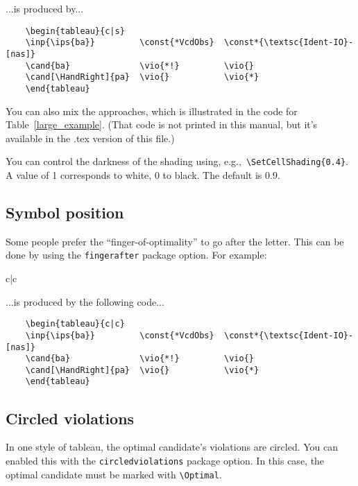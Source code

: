 \documentclass{article}
\def\eg{e.g.,~}
\begin{document}
\noindent ...is produced by...

\begin{verbatim}
	\begin{tableau}{c|s}
	\inp{\ips{ba}}         \const{*VcdObs}  \const*{\textsc{Ident-IO}-[nas]}
	\cand{ba}              \vio{*!}         \vio{}
	\cand[\HandRight]{pa}  \vio{}           \vio{*}
	\end{tableau}
\end{verbatim}

You can also mix the approaches, which is illustrated in the code for Table~\ref{large_example}. (That code is not printed in this manual, but it's available in the .tex version of this file.)

You can control the darkness of the shading using, \eg \verb+\SetCellShading{0.4}+. A value of 1 corresponds to white, 0 to black. The default is 0.9.

\subsection{Symbol position}
Some people prefer the ``finger-of-optimality'' to go after the letter. This can be done by using the \verb+fingerafter+ package option. For example:

\begin{center}
	\LetterBeforeFinger
	\begin{tableau}{c|c}
				
			\vio{*!}	\vio{}
		\vio{}		\vio{*}
	\end{tableau}
\end{center}

\noindent ...is produced by the following code...

\begin{verbatim}
	\begin{tableau}{c|c}
	\inp{\ips{ba}}         \const{*VcdObs}  \const*{\textsc{Ident-IO}-[nas]}
	\cand{ba}              \vio{*!}         \vio{}
	\cand[\HandRight]{pa}  \vio{}           \vio{*}
	\end{tableau}
\end{verbatim}

\subsection{Circled violations}
In one style of tableau, the optimal candidate's violations are circled. You can enabled this with the \verb+circledviolations+ package option. In this case, the optimal candidate must be marked with \verb+\Optimal+.
\end{document}
